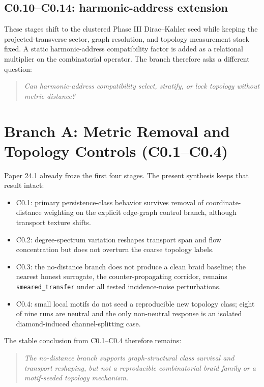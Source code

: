 \documentclass[11pt]{article}
\begin{document}
\subsection{C0.10--C0.14: harmonic-address extension}

These stages shift to the clustered Phase III Dirac--Kahler seed while keeping the projected-transverse sector, graph resolution, and topology measurement stack fixed. A static harmonic-address compatibility factor is added as a relational multiplier on the combinatorial operator. The branch therefore asks a different question:
\begin{quote}
\emph{Can harmonic-address compatibility select, stratify, or lock topology without metric distance?}
\end{quote}

\section{Branch A: Metric Removal and Topology Controls (C0.1--C0.4)}

Paper 24.1 already froze the first four stages. The present synthesis keeps that result intact:
\begin{itemize}
\item C0.1: primary persistence-class behavior survives removal of coordinate-distance weighting on the explicit edge-graph control branch, although transport texture shifts.
\item C0.2: degree-spectrum variation reshapes transport span and flow concentration but does not overturn the coarse topology labels.
\item C0.3: the no-distance branch does not produce a clean braid baseline; the nearest honest surrogate, the counter-propagating corridor, remains \texttt{smeared\_transfer} under all tested incidence-noise perturbations.
\item C0.4: small local motifs do not seed a reproducible new topology class; eight of nine runs are neutral and the only non-neutral response is an isolated diamond-induced channel-splitting case.
\end{itemize}

The stable conclusion from C0.1--C0.4 therefore remains:
\begin{quote}
\emph{The no-distance branch supports graph-structural class survival and transport reshaping, but not a reproducible combinatorial braid family or a motif-seeded topology mechanism.}
\end{quote}
\end{document}
